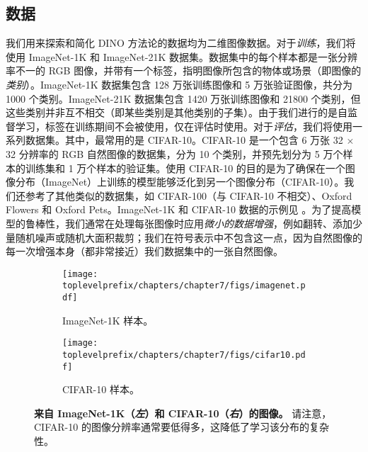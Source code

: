 \documentclass[../../book-main_zh.tex]{subfiles}
\begin{document}
\subsection{数据}\label{sub:contrastive_learning_data}

我们用来探索和简化 DINO 方法论的数据均为二维图像数据。对于\textit{训练}，我们将使用 ImageNet-1K 和 ImageNet-21K 数据集。数据集中的每个样本都是一张分辨率不一的 RGB 图像，并带有一个标签，指明图像所包含的物体或场景（即图像的\textit{类别}）。ImageNet-1K 数据集包含 128 万张训练图像和 5 万张验证图像，共分为 1000 个类别。ImageNet-21K 数据集包含 1420 万张训练图像和 21800 个类别，但这些类别并非互不相交（即某些类别是其他类别的子集）。由于我们进行的是自监督学习，标签在训练期间不会被使用，仅在评估时使用。对于\textit{评估}，我们将使用一系列数据集。其中，最常用的是 CIFAR-10。CIFAR-10 是一个包含 6 万张 32 \(\times\) 32 分辨率的 RGB 自然图像的数据集，分为 10 个类别，并预先划分为 5 万个样本的训练集和 1 万个样本的验证集。使用 CIFAR-10 的目的是为了确保在一个图像分布（ImageNet）上训练的模型能够泛化到另一个图像分布（CIFAR-10）。我们还参考了其他类似的数据集，如 CIFAR-100（与 CIFAR-10 不相交）、Oxford Flowers 和 Oxford Pets。ImageNet-1K 和 CIFAR-10 数据的示例见 。为了提高模型的鲁棒性，我们通常在处理每张图像时应用\textit{微小的数据增强}，例如翻转、添加少量随机噪声或随机大面积裁剪；我们在符号表示中不包含这一点，因为自然图像的每一次增强本身（都非常接近）我们数据集中的一张自然图像。

\begin{figure}
    \centering
    
    \hfill 
    \begin{subfigure}{0.3\textwidth}
        \centering 
        \texttt{[image: \\toplevelprefix/chapters/chapter7/figs/imagenet.pdf]}
        \caption{\small ImageNet-1K 样本。}
    \end{subfigure}
    \hfill 
    \begin{subfigure}{0.26\textwidth}
        \centering 
        \texttt{[image: \\toplevelprefix/chapters/chapter7/figs/cifar10.pdf]}
        \caption{\small CIFAR-10 样本。}
    \end{subfigure}
    \hfill 
    \phantom{}

    \caption{\small\textbf{来自 ImageNet-1K（\textit{左}）和 CIFAR-10（\textit{右}）的图像。} 请注意，CIFAR-10 的图像分辨率通常要低得多，这降低了学习该分布的复杂性。}
    \label{fig:in1k_cifar10_examples}
\end{figure}
\end{document}
